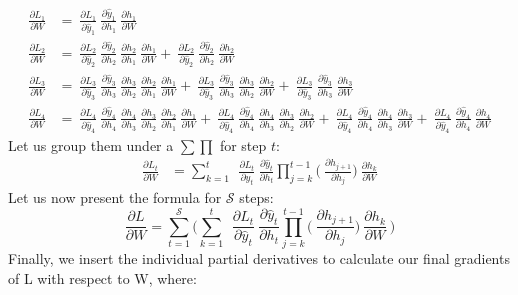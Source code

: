 \documentclass{article}
\begin{document}
\begin{align*}
\frac{\partial L_1}{ \partial{W}} & = ~\frac{\partial L_1}{ \partial \hat{y}_1}~\frac{\partial \hat{y}_1}{ \partial h_1}
  ~\frac{\partial h_1}{ \partial W} \\
	\frac{\partial L_2}{ \partial{W}} & = ~\frac{\partial L_2}{ \partial \hat{y}_2}~\frac{\partial \hat{y}_2}{ \partial h_2}
 ~\frac{\partial h_2}{ \partial h_1} ~\frac{\partial h_1}{ \partial W}	+ ~\frac{\partial L_2}{ \partial \hat{y}_2}~\frac{\partial \hat{y}_2}{ \partial h_2}
  ~\frac{\partial h_2}{ \partial W} \\
 \frac{\partial L_3}{ \partial{W}} & = ~\frac{\partial L_3}{ \partial \hat{y}_3}~\frac{\partial \hat{y}_3}{ \partial h_3}
 ~\frac{\partial h_3}{ \partial h_2} ~\frac{\partial h_2}{ \partial h_1} ~\frac{\partial h_1}{ \partial W}	+ ~\frac{\partial L_3}{ \partial \hat{y}_3}~\frac{\partial \hat{y}_3}{ \partial h_3}
 ~\frac{\partial h_3}{ \partial h_2} ~\frac{\partial h_2}{ \partial W} +  ~\frac{\partial L_3}{ \partial \hat{y}_3}~\frac{\partial \hat{y}_3}{ \partial h_3}
  ~\frac{\partial h_3}{ \partial W} \\
 \frac{\partial L_4}{ \partial{W}} & = ~\frac{\partial L_4}{ \partial \hat{y}_4}~\frac{\partial \hat{y}_4}{ \partial h_4}
 ~\frac{\partial h_4}{ \partial h_3}~\frac{\partial h_3}{ \partial h_2}~\frac{\partial h_2}{ \partial h_1} ~\frac{\partial h_1}{ \partial W}	+ ~\frac{\partial L_4}{ \partial \hat{y}_4}~\frac{\partial \hat{y}_4}{ \partial h_4}
 ~\frac{\partial h_4}{ \partial h_3} ~\frac{\partial h_3}{ \partial h_2} ~\frac{\partial h_2}{ \partial W} +  ~\frac{\partial L_4}{ \partial \hat{y}_4}~\frac{\partial \hat{y}_4}{ \partial h_4}
 ~\frac{\partial h_4}{ \partial h_3} ~\frac{\partial h_3}{ \partial W} + ~\frac{\partial L_4}{ \partial \hat{y}_4}~\frac{\partial \hat{y}_4}{ \partial h_4}
  ~\frac{\partial h_4}{ \partial W}
\end{align*}
Let us group them under a $\sum \prod$  for step $t$:
\begin{align*}
	\frac{\partial L_t}{ \partial{W}} & = \sum_{k=1}^{t} ~
	~\frac{\partial L_t}{\partial \hat{y}_t}
	~\frac{\partial \hat{y}_t}{\partial h_t}
        \prod_{j=k}^{t-1} \bigg(
	~\frac{\partial h_{j+1}}{\partial h_{j}}
        \bigg)
	~\frac{\partial h_k}{\partial W}
\end{align*}
Let us now present the formula for $\mathcal{S}$ steps:
\begin{equation}
	\frac{\partial L}{ \partial{W}} = \sum_{t=1}^{\mathcal{S}} 
	\bigg(	
	 \sum_{k=1}^{t} ~
	~\frac{\partial L_t}{\partial \hat{y}_t}
	~\frac{\partial \hat{y}_t}{\partial h_t}
        \prod_{j=k}^{t-1} \bigg(
	~\frac{\partial h_{j+1}}{\partial h_{j}}
        \bigg)
	~\frac{\partial h_k}{\partial W}~
	\bigg) 
 \label{eqn:partial_L_W}
\end{equation}
Finally, we insert the individual partial derivatives to calculate our final gradients of L with respect to W, where:
\end{document}
